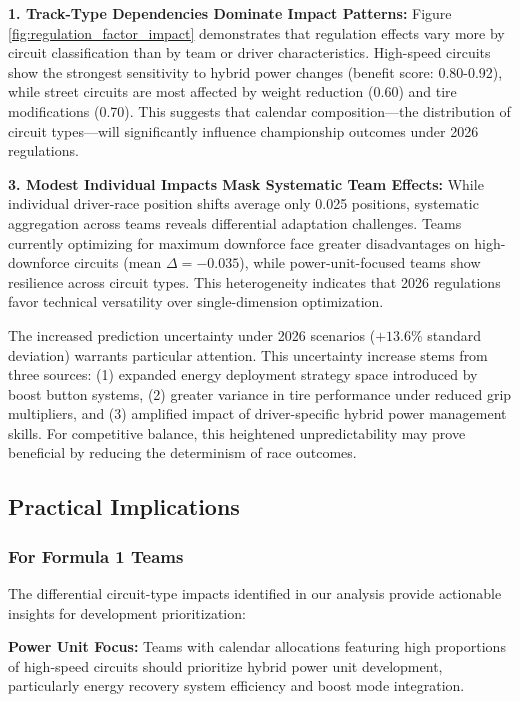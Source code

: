 \documentclass[conference]{IEEEtran}
\begin{document}
\textbf{1. Track-Type Dependencies Dominate Impact Patterns:} Figure \ref{fig:regulation_factor_impact} demonstrates that regulation effects vary more by circuit classification than by team or driver characteristics. High-speed circuits show the strongest sensitivity to hybrid power changes (benefit score: 0.80-0.92), while street circuits are most affected by weight reduction (0.60) and tire modifications (0.70). This suggests that calendar composition—the distribution of circuit types—will significantly influence championship outcomes under 2026 regulations.

\textbf{3. Modest Individual Impacts Mask Systematic Team Effects:} While individual driver-race position shifts average only 0.025 positions, systematic aggregation across teams reveals differential adaptation challenges. Teams currently optimizing for maximum downforce face greater disadvantages on high-downforce circuits (mean $\Delta = -0.035$), while power-unit-focused teams show resilience across circuit types. This heterogeneity indicates that 2026 regulations favor technical versatility over single-dimension optimization.

The increased prediction uncertainty under 2026 scenarios ($+13.6\%$ standard deviation) warrants particular attention. This uncertainty increase stems from three sources: (1) expanded energy deployment strategy space introduced by boost button systems, (2) greater variance in tire performance under reduced grip multipliers, and (3) amplified impact of driver-specific hybrid power management skills. For competitive balance, this heightened unpredictability may prove beneficial by reducing the determinism of race outcomes.

\subsection{Practical Implications}

\subsubsection{For Formula 1 Teams}

The differential circuit-type impacts identified in our analysis provide actionable insights for development prioritization:

\textbf{Power Unit Focus:} Teams with calendar allocations featuring high proportions of high-speed circuits should prioritize hybrid power unit development, particularly energy recovery system efficiency and boost mode integration.
\end{document}

